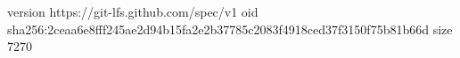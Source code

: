 version https://git-lfs.github.com/spec/v1
oid sha256:2ceaa6e8fff245ae2d94b15fa2e2b37785c2083f4918ced37f3150f75b81b66d
size 7270
